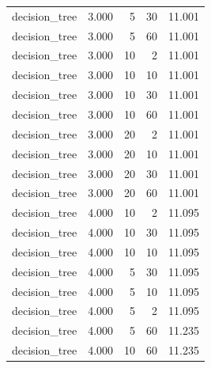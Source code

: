 \begin{tabular}{lrrrr}
decision_tree & 3.000 & 5 & 30 & 11.001 \\
decision_tree & 3.000 & 5 & 60 & 11.001 \\
decision_tree & 3.000 & 10 & 2 & 11.001 \\
decision_tree & 3.000 & 10 & 10 & 11.001 \\
decision_tree & 3.000 & 10 & 30 & 11.001 \\
decision_tree & 3.000 & 10 & 60 & 11.001 \\
decision_tree & 3.000 & 20 & 2 & 11.001 \\
decision_tree & 3.000 & 20 & 10 & 11.001 \\
decision_tree & 3.000 & 20 & 30 & 11.001 \\
decision_tree & 3.000 & 20 & 60 & 11.001 \\
decision_tree & 4.000 & 10 & 2 & 11.095 \\
decision_tree & 4.000 & 10 & 30 & 11.095 \\
decision_tree & 4.000 & 10 & 10 & 11.095 \\
decision_tree & 4.000 & 5 & 30 & 11.095 \\
decision_tree & 4.000 & 5 & 10 & 11.095 \\
decision_tree & 4.000 & 5 & 2 & 11.095 \\
decision_tree & 4.000 & 5 & 60 & 11.235 \\
decision_tree & 4.000 & 10 & 60 & 11.235 \\
\bottomrule
\end{tabular}
